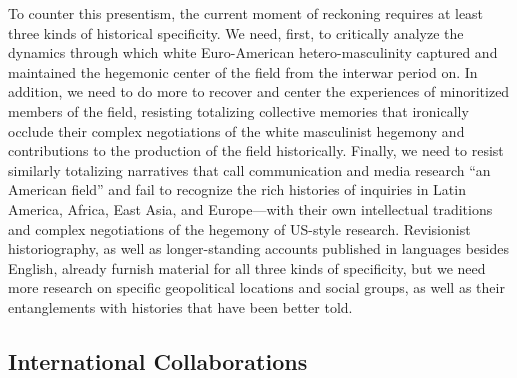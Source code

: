 \documentclass{tufte-handout}
\begin{document}
To counter this presentism, the current moment of reckoning requires at
least three kinds of historical specificity. We need, first, to
critically analyze the dynamics through which white Euro-American
hetero-masculinity captured and maintained the hegemonic center of the
field from the interwar period on. In addition, we need to do more to
recover and center the experiences of minoritized members of the field,
resisting totalizing collective memories that ironically occlude their
complex negotiations of the white masculinist hegemony and contributions
to the production of the field historically. Finally, we need to resist
similarly totalizing narratives that call communication and media
research ``an American field'' and fail to recognize the rich histories
of inquiries in Latin America, Africa, East Asia, and Europe---with
their own intellectual traditions and complex negotiations of the
hegemony of US-style research. Revisionist historiography, as well as
longer-standing accounts published in languages besides English, already
furnish material for all three kinds of specificity, but we need more
research on specific geopolitical locations and social groups, as well
as their entanglements with histories that have been better told.

\hypertarget{international-collaborations}{%
\subsection{International
Collaborations}\label{international-collaborations}}
\end{document}
